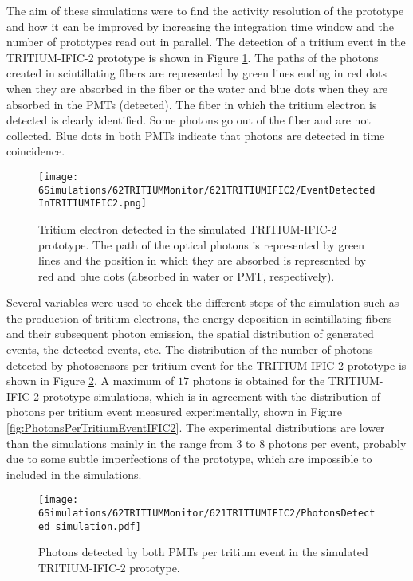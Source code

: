 The aim of these simulations were to find the activity resolution of the prototype and how it can be improved by increasing the integration time window and the number of prototypes read out in parallel. The detection of a tritium event in the TRITIUM-IFIC-2 prototype is shown in Figure \ref{fig:TritiumEventDetectedInSimulatedPrototype}. The paths of the photons created in scintillating fibers are represented by green lines ending in red dots when they are absorbed in the fiber or the water and blue dots when they are absorbed in the PMTs (detected). The fiber in which the tritium electron is detected is clearly identified. Some photons go out of the fiber and are not collected. Blue dots in both PMTs indicate that photons are detected in time coincidence.

\begin{figure}[hbtp]
\centering
\texttt{[image: 6Simulations/62TRITIUMMonitor/621TRITIUMIFIC2/EventDetectedInTRITIUMIFIC2.png]}
\caption{Tritium electron detected in the simulated TRITIUM-IFIC-2 prototype. The path of the optical photons is represented by green lines and the position in which they are absorbed is represented by red and blue dots (absorbed in water or PMT, respectively).\label{fig:TritiumEventDetectedInSimulatedPrototype}}
\end{figure}

Several variables were used to check the different steps of the simulation such as the production of tritium electrons, the energy deposition in scintillating fibers and their subsequent photon emission, the spatial distribution of generated events, the detected events, etc. The distribution of the number of photons detected by photosensors per tritium event for the TRITIUM-IFIC-2 prototype is shown in Figure \ref{fig:SimulatedPhotonsDetected}. A maximum of $17$ photons is obtained for the TRITIUM-IFIC-2 prototype simulations, which is in agreement with the distribution of photons per tritium event measured experimentally, shown in Figure \ref{fig:PhotonsPerTritiumEventIFIC2}. The experimental distributions are lower than the simulations mainly in the range from $3$ to $8$ photons per event, probably due to some subtle imperfections of the prototype, which are impossible to included in the simulations.

\begin{figure}[hbtp]
\centering
\texttt{[image: 6Simulations/62TRITIUMMonitor/621TRITIUMIFIC2/PhotonsDetected\_simulation.pdf]}
\caption{Photons detected by both PMTs per tritium event in the simulated TRITIUM-IFIC-2 prototype.\label{fig:SimulatedPhotonsDetected}}
\end{figure}

